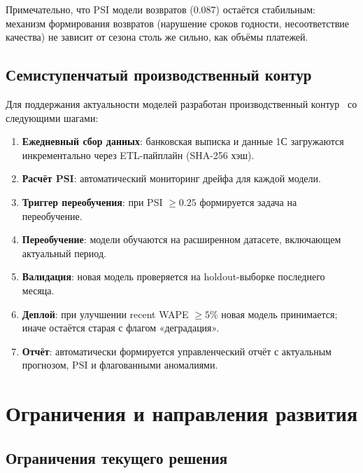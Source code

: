 Примечательно, что PSI модели возвратов (0.087) остаётся стабильным: механизм формирования возвратов (нарушение сроков годности, несоответствие качества) не зависит от сезона столь же сильно, как объёмы платежей.

\subsection{Семиступенчатый производственный контур}

Для поддержания актуальности моделей разработан производственный контур~\cite{sculley2015hidden} со следующими шагами:

\begin{enumerate}
  \item \textbf{Ежедневный сбор данных}: банковская выписка и данные 1С загружаются инкрементально через ETL-пайплайн (SHA-256 хэш).
  \item \textbf{Расчёт PSI}: автоматический мониторинг дрейфа для каждой модели.
  \item \textbf{Триггер переобучения}: при PSI $\ge 0.25$ формируется задача на переобучение.
  \item \textbf{Переобучение}: модели обучаются на расширенном датасете, включающем актуальный период.
  \item \textbf{Валидация}: новая модель проверяется на holdout-выборке последнего месяца.
  \item \textbf{Деплой}: при улучшении recent WAPE $\ge 5\%$ новая модель принимается; иначе остаётся старая с флагом «деградация».
  \item \textbf{Отчёт}: автоматически формируется управленческий отчёт с актуальным прогнозом, PSI и флагованными аномалиями.
\end{enumerate}

\section{Ограничения и направления развития}

\subsection{Ограничения текущего решения}


